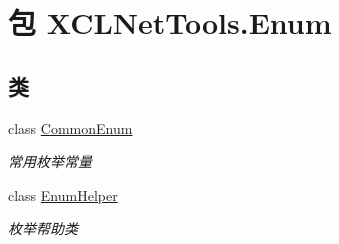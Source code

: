 \hypertarget{namespace_x_c_l_net_tools_1_1_enum}{\section{包 X\-C\-L\-Net\-Tools.\-Enum}
\label{namespace_x_c_l_net_tools_1_1_enum}
}
\subsection*{类}
\begin{DoxyCompactItemize}
\item 
class \hyperlink{class_x_c_l_net_tools_1_1_enum_1_1_common_enum}{Common\-Enum}
\begin{DoxyCompactList}\small\item\em 常用枚举常量 \end{DoxyCompactList}\item 
class \hyperlink{class_x_c_l_net_tools_1_1_enum_1_1_enum_helper}{Enum\-Helper}
\begin{DoxyCompactList}\small\item\em 枚举帮助类 \end{DoxyCompactList}\end{DoxyCompactItemize}
